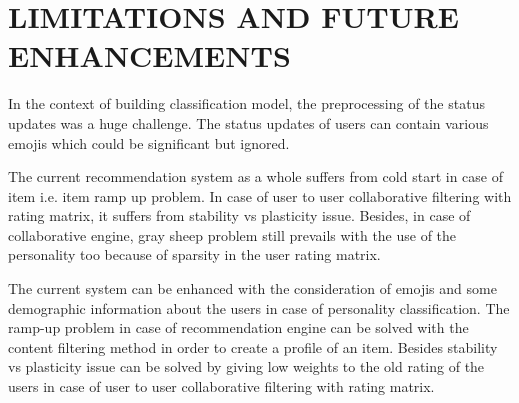 \newpage
\section{LIMITATIONS AND FUTURE ENHANCEMENTS}
In the context of building classification model, the preprocessing of the status updates was a huge challenge. The status updates of users can contain various emojis which could be significant but ignored. 

The current recommendation system as a whole suffers from cold start in case of item i.e. item ramp up problem. In case of user to user collaborative filtering with rating matrix, it suffers from stability vs plasticity issue. Besides, in case of collaborative engine, gray sheep problem still prevails with the use of the personality too because of sparsity in the user rating matrix.

The current system can be enhanced with the consideration of emojis and some demographic information about the users in case of personality classification. The ramp-up problem in case of recommendation engine can be solved with the content filtering method in order to create a profile of an item. Besides stability vs plasticity issue can be solved by giving low weights to the old rating of the users in case of user to user collaborative filtering with rating matrix.
